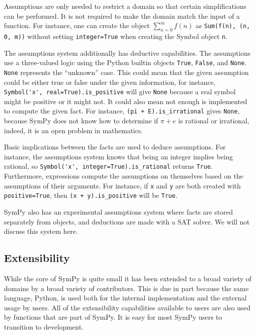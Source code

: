 Assumptions are only needed to restrict a domain so that certain
simplifications can be performed. It is not required to make the domain match
the input of a function. For instance, one can create the object
$\sum_{n=0}^m f(n)$ as \verb|Sum(f(n), (n, 0, m))| without setting
\texttt{integer=True} when creating the Symbol object \texttt{n}.

The assumptions system additionally has deductive capabilities. The
assumptions use a three-valued logic using the Python builtin objects
\texttt{True}, \texttt{False}, and \texttt{None}. \texttt{None} represents the
``unknown'' case. This could mean that the given assumption could be either
true or false under the given information, for instance,
\verb|Symbol('x', real=True).is_positive| will give \texttt{None} because a real
symbol might be positive or it might not. It could also mean not enough is
implemented to compute the given fact. For instance,
\verb|(pi + E).is_irrational| gives \texttt{None}, because SymPy does not know
how to determine if $\pi + e$ is rational or irrational, indeed, it is an open
problem in mathematics.


Basic implications between the facts are used to deduce assumptions. For
instance, the assumptions system knows that being an integer implies being
rational, so \verb|Symbol('x', integer=True).is_rational| returns
\texttt{True}. Furthermore, expressions compute the assumptions on themselves
based on the assumptions of their arguments. For instance, if \texttt{x} and
\texttt{y} are both created with \texttt{positive=True}, then
\verb|(x + y).is_positive| will be \texttt{True}.

SymPy also has an experimental assumptions system where facts are stored
separately from objects, and deductions are made with a SAT solver. We will not
discuss this system here.


\subsection{Extensibility}

While the core of SymPy is quite small it has been extended to a broad variety
of domains by a broad variety of contributors.  This is due in part because the
same language, Python, is used both for the internal implementation and the
external usage by users.  All of the extensibility capabilities available to
users are also used by functions that are part of SymPy.  It is easy for most
SymPy users to transition to development.


